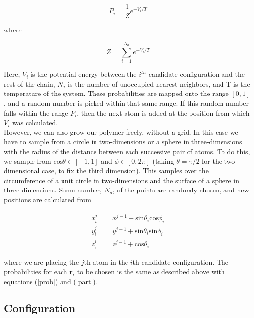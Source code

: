 \documentclass{article}
\begin{document}
\begin{multicols}{2}
\begin{equation}
\label{prob}
P_i = \frac{1}{Z} e^{-V_i/T}
\end{equation}

\noindent where

\begin{equation}
\label{part}
Z = \sum \limits _{i=1}^{N_a} e^{-V_i/T}
\end{equation}

\noindent Here, $V_i$ is the potential energy between the $i^{th}$ candidate configuration and the rest of the chain, $N_a$ is the number of unoccupied nearest neighbors, and T is the temperature of the system.  These probabilities are mapped onto the range $[0,1]$, and a random number is picked within that same range.  If this random number falls within the range $P_i$, then the next atom is added at the position from which $V_i$ was calculated.  \\

However, we can also grow our polymer freely, without a grid.  In this case we have to sample from a circle in two-dimensions or a sphere in three-dimensions with the radius of the distance between each successive pair of atoms.  To do this, we sample from $\mathrm{cos}\theta \in [-1,1]$ and $\phi \in [0,2\pi]$ (taking $\theta = \pi/2$ for the two-dimensional case, to fix the third dimension).  This samples over the circumference of a unit circle in two-dimensions and the surface of a sphere in three-dimensions.  Some number, $N_a$, of the points are randomly chosen, and new positions are calculated from

\begin{equation}
\begin{split}
x^{j}_i & = x^{j-1} + \mathrm{sin}\theta _i \mathrm{cos}\phi _i \\
y^{j}_i & = y^{j-1} + \mathrm{sin} \theta _i \mathrm{sin} \phi _i \\
z^{j}_i & = z^{j-1} + \mathrm{cos} \theta _i
\end{split}
\end{equation}

\noindent where we are placing the $j$th atom in the $i$th candidate configuration.  The probabilities for each $\textbf{r}_i$ to be chosen is the same as described above with equations (\ref{prob}) and (\ref{part}).

\subsection{Configuration}


\end{multicols}
\end{document}
